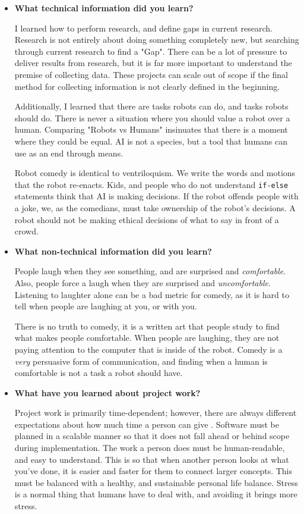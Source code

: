 \documentclass[onecolumn, draftclsnofoot,10pt, compsoc]{IEEEtran}
\begin{document}
\begin{itemize}
\item{\textbf{What technical information did you learn?}}

    I learned how to perform research, and define gaps in current research.
    Research is not entirely about doing something completely new, but searching through current research to find a "Gap".
    There can be a lot of pressure to deliver results from research, but it is far more important to understand the premise of collecting data.
    These projects can scale out of scope if the final method for collecting information is not clearly defined in the beginning.

    Additionally, I learned that there are tasks robots can do, and tasks robots should do.
    There is never a situation where you should value a robot over a human.
    Comparing "Robots vs Humans" insinuates that there is a moment where they could be equal.
    AI is not a species, but a tool that humans can use as an end through means.

    Robot comedy is identical to ventriloquism.
    We write the words and motions that the robot re-enacts.
    Kids, and people who do not understand \texttt{if-else} statements think that AI is making decisions.
    If the robot offends people with a joke, we, as the comedians, must take ownership of the robot's decisions.
    A robot should not be making ethical decisions of what to say in front of a crowd.


\item{\textbf{What non-technical information did you learn?}}


    People laugh when they see something, and are surprised and \textit{comfortable}.
    Also, people force a laugh when they are surprised and \textit{uncomfortable}.
    Listening to laughter alone can be a bad metric for comedy, as it is hard to tell when people are laughing at you, or with you.

    There is no truth to comedy, it is a written art that people study to find what makes people comfortable.
    When people are laughing, they are not paying attention to the computer that is inside of the robot.
    Comedy is a \textit{very} persuasive form of communication, and finding when a human is comfortable is not a task a robot should have.


\item{\textbf{What have you learned about project work?}}

    Project work is primarily time-dependent; however, there are always different expectations about how much time a person can give \cite{theMythicalManMonth}.
    Software must be planned in a scalable manner so that it does not fall ahead or behind scope during implementation.
    The work a person does must be human-readable, and easy to understand.
    This is so that when another person looks at what you've done, it is easier and faster for them to connect larger concepts.
    This must be balanced with a healthy, and sustainable personal life balance.
    Stress is a normal thing that humans have to deal with, and avoiding it brings more stress.





\end{itemize}
\end{document}
